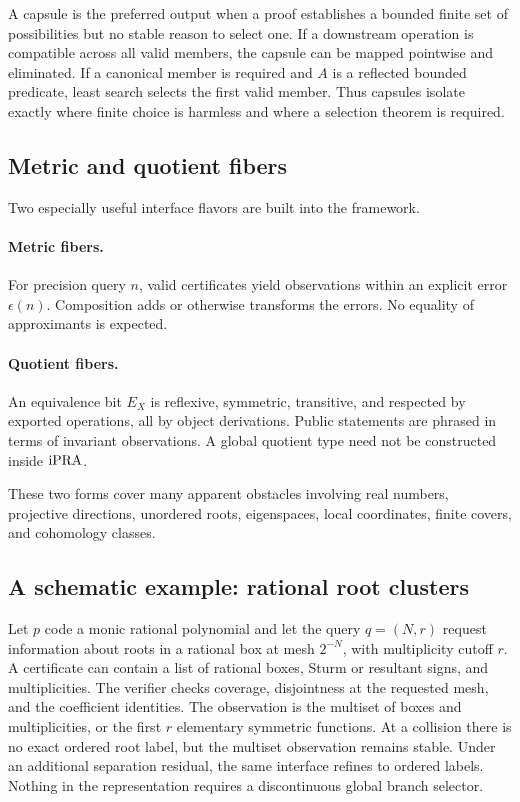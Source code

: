 A capsule is the preferred output when a proof establishes a bounded finite
set of possibilities but no stable reason to select one.  If a downstream
operation is compatible across all valid members, the capsule can be mapped
pointwise and eliminated.  If a canonical member is required and \(A\) is a
reflected bounded predicate, least search selects the first valid member.
Thus capsules isolate exactly where finite choice is harmless and where a
selection theorem is required.

\subsection{Metric and quotient fibers}

Two especially useful interface flavors are built into the framework.

\paragraph{Metric fibers.}
For precision query \(n\), valid certificates yield observations within an
explicit error \(\epsilon(n)\).  Composition adds or otherwise transforms the
errors.  No equality of approximants is expected.

\paragraph{Quotient fibers.}
An equivalence bit \(E_X\) is reflexive, symmetric, transitive, and respected
by exported operations, all by object derivations.  Public statements are
phrased in terms of invariant observations.  A global quotient type need not
be constructed inside \(\mathrm{iPRA}\).

These two forms cover many apparent obstacles involving real numbers,
projective directions, unordered roots, eigenspaces, local coordinates,
finite covers, and cohomology classes.

\subsection{A schematic example: rational root clusters}

Let \(p\) code a monic rational polynomial and let the query \(q=(N,r)\)
request information about roots in a rational box at mesh \(2^{-N}\), with
multiplicity cutoff \(r\).  A certificate can contain a list of rational boxes,
Sturm or resultant signs, and multiplicities.  The verifier checks coverage,
disjointness at the requested mesh, and the coefficient identities.  The
observation is the multiset of boxes and multiplicities, or the first \(r\)
elementary symmetric functions.  At a collision there is no exact ordered
root label, but the multiset observation remains stable.  Under an additional
separation residual, the same interface refines to ordered labels.  Nothing in
the representation requires a discontinuous global branch selector.
